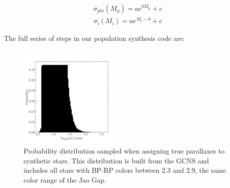 \begin{align}\label{eqn:plxCalib}
	\sigma_{plx}(M_{g}) = ae^{bM_{g}}+c
\end{align}
\begin{align}\label{eqn:MagCalib}
	\sigma_{i}(M_{i}) = ae^{M_{i}-b}+c
\end{align}

\noindent The full series of steps in our population synthesis code
are:

\begin{figure}
	\centering
	\includegraphics[width=0.45\textwidth]{pdist.pdf}
	\caption{Probability distribution sampled when assigning true parallaxes to
	synthetic stars. This distribution is built from the GCNS and includes all
	stars with BP-RP colors between 2.3 and 2.9, the same color range
	of the Jao Gap.}
	\label{fig:pdist}
\end{figure}

